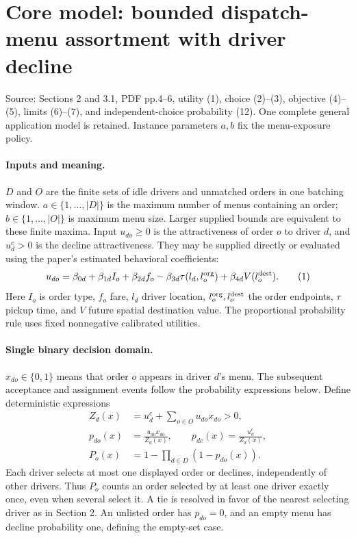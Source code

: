 \documentclass[11pt]{article}
\begin{document}
\section*{Core model: bounded dispatch-menu assortment with driver decline}
Source: Sections 2 and 3.1, PDF pp.4--6, utility (1), choice (2)--(3),
objective (4)--(5), limits (6)--(7), and independent-choice probability
(12). One complete general application model is retained. Instance
parameters $a,b$ fix the menu-exposure policy.
\paragraph{Inputs and meaning.}
$D$ and $O$ are the finite sets of idle drivers and unmatched orders
in one batching window. $a\in\{1,\ldots,|D|\}$ is the maximum number
of menus containing an order; $b\in\{1,\ldots,|O|\}$ is maximum menu
size. Larger supplied bounds are equivalent to these finite maxima.
Input $u_{do}\ge0$ is the attractiveness of order $o$ to driver $d$,
and $u_d^c>0$ is the decline attractiveness. They may be supplied directly
or evaluated using the paper's estimated behavioral coefficients:
\[
 u_{do}=\beta_{0d}+\beta_{1d}I_o+\beta_{2d}f_o
 -\beta_{3d}\tau(l_d,l_o^{\rm org})
 +\beta_{4d}V(l_o^{\rm dest}).\tag{1}
\]
Here $I_o$ is order type, $f_o$ fare, $l_d$ driver location,
$l_o^{\rm org},l_o^{\rm dest}$ the order endpoints, $\tau$ pickup time,
and $V$ future spatial destination value.
The proportional probability rule uses fixed nonnegative calibrated utilities.
\paragraph{Single binary decision domain.}
$x_{do}\in\{0,1\}$ means that order $o$ appears in driver $d$'s menu.
The subsequent acceptance and assignment events follow the probability expressions below.
Define deterministic expressions
\begin{align*}
 Z_d(x)&=u_d^c+\sum_{o\in O}u_{do}x_{do}>0,\\
 p_{do}(x)&=\frac{u_{do}x_{do}}{Z_d(x)},\qquad
 p_{dc}(x)=\frac{u_d^c}{Z_d(x)},\\
 P_o(x)&=1-\prod_{d\in D}(1-p_{do}(x)).
\end{align*}
Each driver selects at most one displayed order or declines, independently
of other drivers. Thus $P_o$ counts an order selected by at least one
driver exactly once, even when several select it. A tie is resolved in
favor of the nearest selecting driver as in Section 2.
An unlisted order has $p_{do}=0$, and an empty menu has decline probability
one, defining the empty-set case.
\end{document}
